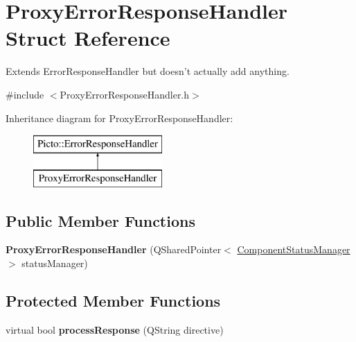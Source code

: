 \hypertarget{struct_proxy_error_response_handler}{\section{Proxy\-Error\-Response\-Handler Struct Reference}
\label{struct_proxy_error_response_handler}
}


Extends Error\-Response\-Handler but doesn't actually add anything.  




{\ttfamily \#include $<$Proxy\-Error\-Response\-Handler.\-h$>$}

Inheritance diagram for Proxy\-Error\-Response\-Handler\-:\begin{figure}[H]
\begin{center}
\leavevmode
\includegraphics[height=2.000000cm]{struct_proxy_error_response_handler}
\end{center}
\end{figure}
\subsection*{Public Member Functions}
\begin{DoxyCompactItemize}
\item 
\hypertarget{struct_proxy_error_response_handler_ae6af686afc7468ccc589fba6e08f9da3}{{\bfseries Proxy\-Error\-Response\-Handler} (Q\-Shared\-Pointer$<$ \hyperlink{class_component_status_manager}{Component\-Status\-Manager} $>$ status\-Manager)}\label{struct_proxy_error_response_handler_ae6af686afc7468ccc589fba6e08f9da3}

\end{DoxyCompactItemize}
\subsection*{Protected Member Functions}
\begin{DoxyCompactItemize}
\item 
\hypertarget{struct_proxy_error_response_handler_a5d12ff074e277f2153c2356974b8d8eb}{virtual bool {\bfseries process\-Response} (Q\-String directive)}\label{struct_proxy_error_response_handler_a5d12ff074e277f2153c2356974b8d8eb}

\end{DoxyCompactItemize}


